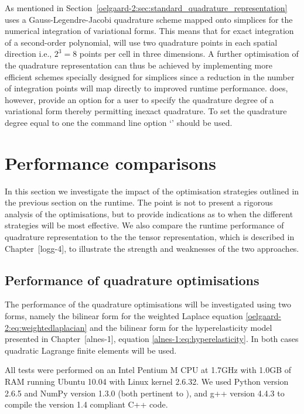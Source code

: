 As mentioned in Section~\ref{oelgaard-2:sec:standard_quadrature_representation}
\ffc{} uses a Gauss-Legendre-Jacobi quadrature scheme mapped onto simplices for
the numerical integration of variational forms.
This means that for exact integration of a second-order polynomial, \ffc{} will
use two quadrature points in each spatial direction i.e., $2^3 = 8$ points per
cell in three dimensions.
A further optimisation of the quadrature representation can thus be achieved
by implementing more efficient schemes specially designed for simplices since
a reduction in the number of integration points will map directly to improved
runtime performance.
\ffc{} does, however, provide an option for a user to specify the
quadrature degree of a variational form thereby permitting inexact quadrature.
To set the quadrature degree equal to one the command line option
`' should be used.
%
\section{Performance comparisons}
%
In this section we investigate the impact of the
optimisation strategies outlined in the previous section on the
runtime. The point is not to present a rigorous analysis of the optimisations,
but to provide indications as to when the different strategies will be most
effective.
We also compare the runtime performance of quadrature representation to the
the tensor representation, which is
described in Chapter~[logg-4], to illustrate
the strength and weaknesses of the two approaches.
%
\subsection{Performance of quadrature optimisations}
\label{oelgaard-2:sec:quad_performance}
%
The performance of the quadrature optimisations will be investigated using two
forms, namely the bilinear form for the weighted Laplace equation
\eqref{oelgaard-2:eq:weightedlaplacian} and the bilinear form for
the hyperelasticity model presented in Chapter~[alnes-1], equation
\eqref{alnes-1:eq:hyperelasticity}.
In both cases quadratic Lagrange finite elements will be used.

All tests were performed on an Intel Pentium M CPU at 1.7GHz with 1.0GB of
RAM running Ubuntu 10.04 with Linux kernel 2.6.32.
We used Python version 2.6.5 and NumPy version 1.3.0
(both pertinent to \ffc{}), and g++ version 4.4.3 to compile the
\ufc{} version 1.4 compliant  C++ code.

